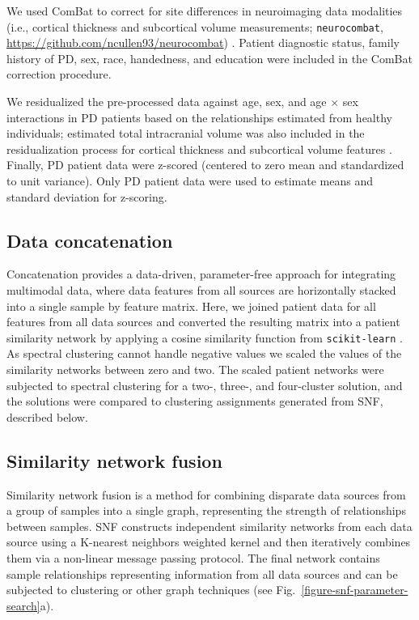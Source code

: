 \documentclass[12pt,aps,pra,reprint,showkeys]{revtex4-1}
\begin{document}
We used ComBat to correct for site differences in neuroimaging data modalities (i.e., cortical thickness and subcortical volume measurements; \texttt{neurocombat}, \url{https://github.com/ncullen93/neurocombat}) \citep{johnson2007adjusting, fortin2018harmonization}.
Patient diagnostic status, family history of PD, sex, race, handedness, and education were included in the ComBat correction procedure.

We residualized the pre-processed data against age, sex, and age $\times$ sex interactions in PD patients based on the relationships estimated from healthy individuals; estimated total intracranial volume was also included in the residualization process for cortical thickness and subcortical volume features \citep{zeighami2017clinical}.
Finally, PD patient data were z-scored (centered to zero mean and standardized to unit variance).
Only PD patient data were used to estimate means and standard deviation for z-scoring.

\subsection*{Data concatenation}

Concatenation provides a data-driven, parameter-free approach for integrating multimodal data, where data features from all sources are horizontally stacked into a single sample by feature matrix.
Here, we joined patient data for all features from all data sources and converted the resulting matrix into a patient similarity network by applying a cosine similarity function from \texttt{scikit-learn} \citep{sklearn}.
As spectral clustering cannot handle negative values we scaled the values of the similarity networks between zero and two.
The scaled patient networks were subjected to spectral clustering \citep{shi2000normalized, yu2003multiclass} for a two-, three-, and four-cluster solution, and the solutions were compared to clustering assignments generated from SNF, described below.

\subsection*{Similarity network fusion}

Similarity network fusion \citep{wang2014similarity} is a method for combining disparate data sources from a group of samples into a single graph, representing the strength of relationships between samples.
SNF constructs independent similarity networks from each data source using a K-nearest neighbors weighted kernel and then iteratively combines them via a non-linear message passing protocol.
The final network contains sample relationships representing information from all data sources and can be subjected to clustering or other graph techniques (see Fig.~\ref{figure-snf-parameter-search}a).
\end{document}
